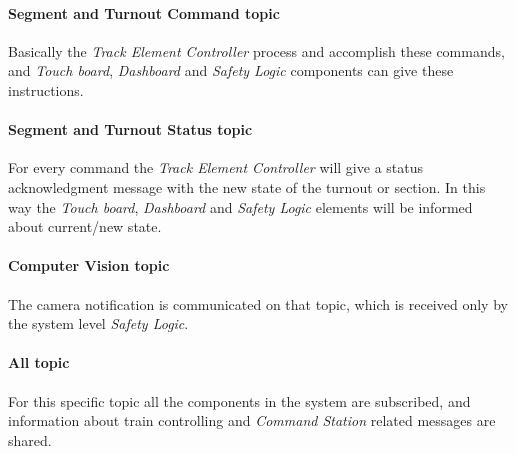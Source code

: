 \paragraph{Segment and Turnout Command topic}\label{par:MQTTTopicCommand}
Basically the \textit{Track Element Controller} process and accomplish these commands, and \textit{Touch board}, \textit{Dashboard} and \textit{Safety Logic} components can give these instructions.

\paragraph{Segment and Turnout Status topic}\label{par:MQTTTopicStatus}
For every command the \textit{Track Element Controller} will give a status acknowledgment message with the new state of the turnout or section. In this way the \textit{Touch board}, \textit{Dashboard} and \textit{Safety Logic} elements will be informed about current/new state.

\paragraph{Computer Vision topic}
The camera notification is communicated on that topic, which is received only by the system level \textit{Safety Logic}.

\paragraph{All topic}
For this specific topic all the components in the system are subscribed, and information about train controlling and \textit{Command Station} related messages are shared.

